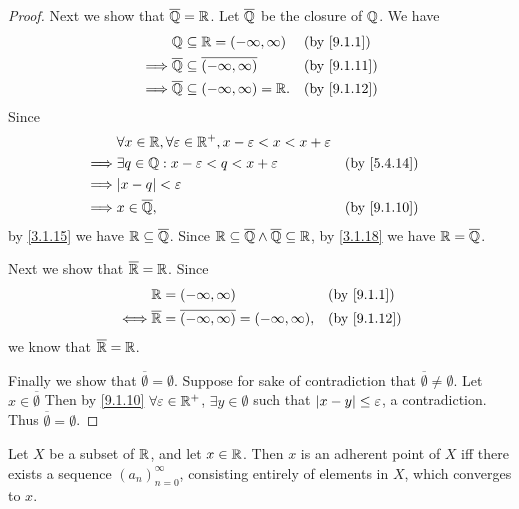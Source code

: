 \begin{proof}
	Next we show that \(\overline{\mathbb{Q}} = \mathbb{R}\).
	Let \(\overline{\mathbb{Q}}\) be the closure of \(\mathbb{Q}\).
	We have
	\begin{align*}
		         & \Q \subseteq \R = (-\infty, \infty)                  &  & \by{9.1.1}  \\
		\implies & \overline{\Q} \subseteq \overline{(-\infty, \infty)} &  & \by{9.1.11} \\
		\implies & \overline{\Q} \subseteq (-\infty, \infty) = \R.      &  & \by{9.1.12}
	\end{align*}
	Since
	\begin{align*}
		         & \forall x \in \R, \forall \varepsilon \in \R^+, x - \varepsilon < x < x + \varepsilon                  \\
		\implies & \exists q \in \Q : x - \varepsilon < q < x + \varepsilon                              &  & \by{5.4.14} \\
		\implies & \abs{x - q} < \varepsilon                                                                              \\
		\implies & x \in \overline{\Q},                                                                  &  & \by{9.1.10}
	\end{align*}
	by \cref{3.1.15} we have \(\mathbb{R} \subseteq \overline{\mathbb{Q}}\).
	Since \(\mathbb{R} \subseteq \overline{\mathbb{Q}} \land \overline{\mathbb{Q}} \subseteq \mathbb{R}\), by \cref{3.1.18} we have \(\mathbb{R} = \overline{\mathbb{Q}}\).

	Next we show that \(\overline{\mathbb{R}} = \mathbb{R}\).
	Since
	\begin{align*}
		     & \R = (-\infty, \infty)                                            &  & \by{9.1.1}  \\
		\iff & \overline{\R} = \overline{(-\infty, \infty)} = (-\infty, \infty), &  & \by{9.1.12}
	\end{align*}
	we know that \(\overline{\mathbb{R}} = \mathbb{R}\).

	Finally we show that \(\overline{\emptyset} = \emptyset\).
	Suppose for sake of contradiction that \(\overline{\emptyset} \neq \emptyset\).
	Let \(x \in \overline{\emptyset}\)
	Then by \cref{9.1.10} \(\forall \varepsilon \in \mathbb{R}^+\), \(\exists y \in \emptyset\) such that \(\left\lvert x - y\right\rvert \leq \varepsilon\), a contradiction.
	Thus \(\overline{\emptyset} = \emptyset\).
\end{proof}

\begin{lem}\label{9.1.14}
	Let \(X\) be a subset of \(\mathbb{R}\), and let \(x \in \mathbb{R}\).
	Then \(x\) is an adherent point of \(X\) iff there exists a sequence \((a_n)_{n = 0}^\infty\), consisting entirely of elements in \(X\), which converges to \(x\).
\end{lem}

